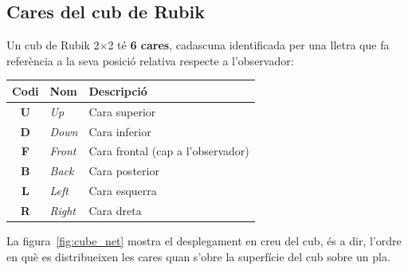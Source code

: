 \documentclass[12pt, a4paper]{article}
\begin{document}
\subsection{Cares del cub de Rubik}

Un cub de Rubik 2$\times$2 té \textbf{6 cares}, cadascuna identificada per una lletra que fa referència a la seva posició relativa respecte a l'observador:

\begin{center}
\begin{tabular}{clp{8cm}}
  \toprule
  \textbf{Codi} & \textbf{Nom} & \textbf{Descripció} \\
  \midrule
  \textbf{U} & \textit{Up}    & Cara superior \\
  \textbf{D} & \textit{Down}  & Cara inferior \\
  \textbf{F} & \textit{Front} & Cara frontal (cap a l'observador) \\
  \textbf{B} & \textit{Back}  & Cara posterior \\
  \textbf{L} & \textit{Left}  & Cara esquerra \\
  \textbf{R} & \textit{Right} & Cara dreta \\
  \bottomrule
\end{tabular}
\end{center}

\vspace{0.5em}
La figura~\ref{fig:cube_net} mostra el desplegament en creu del cub, és a dir, l'ordre en què es distribueixen les cares quan s'obre la superfície del cub sobre un pla.
\end{document}
